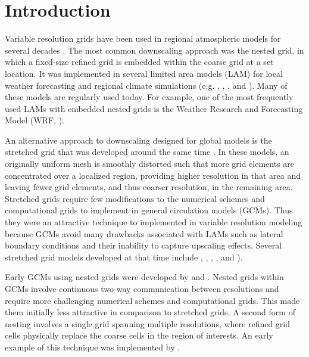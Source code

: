 \section{Introduction}
Variable resolution grids have been used in regional atmospheric models for several decades
\citep{fox1997finite}. The most common downscaling approach was the nested grid, in which
a fixed-size refined grid is embedded within the coarse grid at a set location. It was implemented in several
limited area models (LAM) for local weather forecasting
and regional climate simulations (e.g. \cite{Phillips1979nested}, \cite{pielke1992comprehensive}, \cite{grell1994description},
and \cite{caya1999semi}). Many of these models are regularly used today.
For example, one of the most frequently used LAMs with embedded nested grids is the
Weather Research and Forecasting Model (WRF, \cite{Skamarock:2008db}).

An alternative approach to downscaling designed for global 
models is the stretched grid that was developed
around the same time \citep{Schmidt:1977qo, staniforth1978variable}. 
In these models, an originally
uniform mesh is smoothly distorted such that more grid elements are concentrated
over a localized region, providing higher resolution in that area and leaving 
fewer grid elements, and thus coarser resolution, 
in the remaining area. Stretched grids require few modifications to the
numerical schemes and computational grids to implement in general circulation models (GCMs). 
Thus they were an attractive technique to 
implemented in variable resolution modeling because GCMs avoid many drawbacks 
associated with LAMs such as lateral boundary conditions and their inability
to capture upscaling effects. Several stretched grid models developed
at that time include \cite{paegle1989variable}, \cite{deque1995high},
\cite{yessad1996introduction}, \cite{fox1997finite}, and \cite{cote1998operational}).

Early
GCMs using nested grids were developed by \cite{Ruge:1995cy} and \cite{dudhia2002global}.
Nested grids within GCMs involve continuous two-way 
communication between resolutions and require more challenging numerical
schemes and computational grids.
This made them initially less attractive in comparison to stretched grids. 
A second form of nesting involves a single grid spanning multiple resolutions, where refined
grid cells physically replace the coarse cells in the region of interests.
An early example of this technique was implemented by \cite{Fournier:2004cf}.

